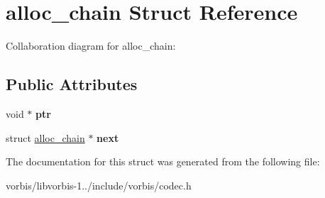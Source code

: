 \hypertarget{structalloc__chain}{\section{alloc\+\_\+chain Struct Reference}
\label{structalloc__chain}
}


Collaboration diagram for alloc\+\_\+chain\+:
\subsection*{Public Attributes}
\begin{DoxyCompactItemize}
\item 
\hypertarget{structalloc__chain_a564538413768f266bd5bda09d892e99d}{void $\ast$ {\bfseries ptr}}\label{structalloc__chain_a564538413768f266bd5bda09d892e99d}

\item 
\hypertarget{structalloc__chain_a596f6605e59080015c3c6dfd07326c83}{struct \hyperlink{structalloc__chain}{alloc\+\_\+chain} $\ast$ {\bfseries next}}\label{structalloc__chain_a596f6605e59080015c3c6dfd07326c83}

\end{DoxyCompactItemize}


The documentation for this struct was generated from the following file\+:\begin{DoxyCompactItemize}
\item 
vorbis/libvorbis-\/1../include/vorbis/codec.\+h\end{DoxyCompactItemize}
